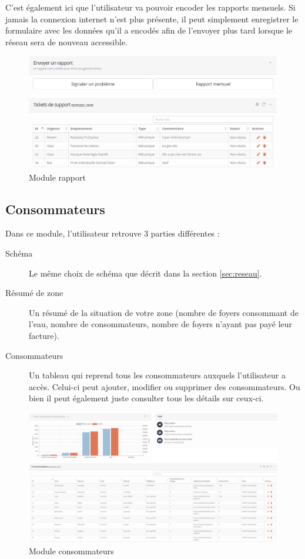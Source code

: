 \documentclass{EPL-master-thesis-covers-FR}
\begin{document}
				C'est également ici que l'utilisateur va pouvoir encoder les rapports mensuels. Si jamais la connexion internet n'est plus présente, il peut simplement enregistrer le formulaire avec les données qu'il a encodés afin de l'envoyer plus tard lorsque le réseau sera de nouveau accessible.
				
				\begin{figure}[H]
					\centering
					\includegraphics[width=1\textwidth]{images/report}
					\caption{Module rapport}
				\end{figure}
			
			\subsection{Consommateurs}
				Dans ce module, l'utilisateur retrouve 3 parties différentes :
				\begin{description}
					\item[Schéma] Le même choix de schéma que décrit dans la section \ref{sec:reseau}.
					\item[Résumé de zone] Un résumé de la situation de votre zone (nombre de foyers consommant de l'eau, nombre de consommateurs, nombre de foyers n'ayant pas payé leur facture).
					\item[Consommateurs] Un tableau qui reprend tous les consommateurs auxquels l'utilisateur a accès. Celui-ci peut ajouter, modifier ou supprimer des consommateurs. Ou bien il peut également juste consulter tous les détails sur ceux-ci.
				\end{description}

				
				\begin{figure}[H]
					\centering
					\includegraphics[width=1\textwidth]{images/consumer}
					\caption{Module consommateurs}
				\end{figure}
				
\end{document}
